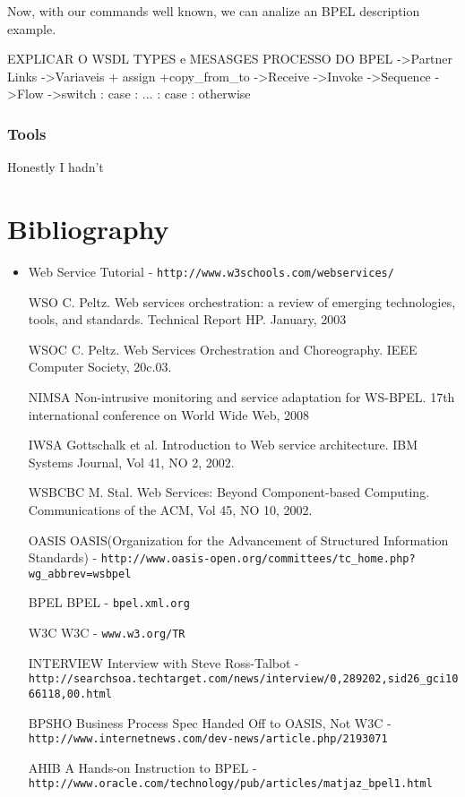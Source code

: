\documentclass[12pt,a4paper]{article}
\begin{document}
Now, with our commands well known, we can analize an BPEL description example.

\begin{center}
  EXPLICAR O WSDL TYPES e MESASGES
  PROCESSO DO BPEL
  ->Partner Links
  ->Variaveis + assign +copy_from_to
  ->Receive
  ->Invoke
  ->Sequence
  ->Flow
  ->switch : case : ... : case : otherwise
\end{center}


\subsubsection{Tools}
Honestly I hadn't 


\section{Bibliography}
\begin{itemize}
\item Web Service Tutorial - \verb!http://www.w3schools.com/webservices/!

\item[WSO] C. Peltz. Web services orchestration: a review of emerging technologies, tools, and standards. Technical Report HP. January, 2003

\item[WSOC] C. Peltz. Web Services Orchestration and Choreography. IEEE Computer Society, 20c.03.

\item[NIMSA] Non-intrusive monitoring and service adaptation for WS-BPEL. 17th international conference on World Wide Web, 2008

\item[IWSA] Gottschalk et al. Introduction to Web service architecture. IBM Systems Journal, Vol 41, NO 2, 2002.

\item[WSBCBC] M. Stal. Web Services: Beyond Component-based Computing. Communications of the ACM, Vol 45, NO 10, 2002.

\item[OASIS] OASIS(Organization for the Advancement of Structured Information Standards) - \verb!http://www.oasis-open.org/committees/tc_home.php?wg_abbrev=wsbpel!

\item[BPEL] BPEL - \verb!bpel.xml.org!

\item[W3C] W3C - \verb!www.w3.org/TR!

\item[INTERVIEW] Interview with Steve Ross-Talbot - \verb!http://searchsoa.techtarget.com/news/interview/0,289202,sid26_gci1066118,00.html!

\item[BPSHO] Business Process Spec Handed Off to OASIS, Not W3C - \verb!http://www.internetnews.com/dev-news/article.php/2193071!

\item[AHIB] A Hands-on Instruction to BPEL - \verb!http://www.oracle.com/technology/pub/articles/matjaz_bpel1.html!

\end{itemize}
\end{document}
